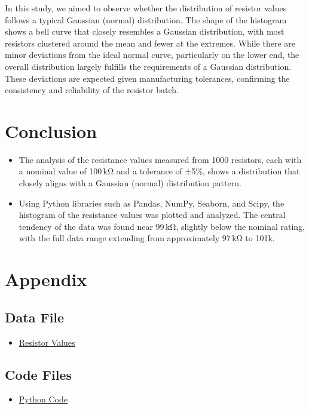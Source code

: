 \documentclass[12pt]{article}
\begin{document}
In this study, we aimed to observe whether the distribution of resistor values follows a typical Gaussian (normal) distribution. The shape of the histogram shows a bell curve that closely resembles a Gaussian distribution, with most resistors clustered around the mean and fewer at the extremes. While there are minor deviations from the ideal normal curve, particularly on the lower end, the overall distribution largely fulfills the requirements of a Gaussian distribution. These deviations are expected given manufacturing tolerances, confirming the consistency and reliability of the resistor batch.

\newpage
\section{Conclusion}
\begin{itemize}
\item The analysis of the resistance values measured from 1000 resistors, each with a nominal value of 100 kΩ and a tolerance of ±5\%, shows a distribution that closely aligns with a Gaussian (normal) distribution pattern.
\item Using Python libraries such as Pandas, NumPy, Seaborn, and Scipy, the histogram of the resistance values was plotted and analyzed. The central tendency of the data was found near 99 kΩ, slightly below the nominal rating, with the full data range extending from approximately 97 kΩ to 101k\textohm.
\end{itemize}

\section{Appendix}
\subsection*{Data File}

\begin{itemize}
  \item \href{https://drive.google.com/drive/folders/1Y8cfFo5tjva2JRQHohGjNMzd-atVvMah?usp=drive_link}{Resistor Values}
\end{itemize}
\vspace{-5mm}
\subsection*{Code Files}
\begin{itemize}
  \item \href{https://drive.google.com/drive/folders/13z_Cev9iF9TGuNE9fz6Ii99t_w-Qxyss?usp=drive_link}{Python Code}
\end{itemize}

    
    
\end{document}
